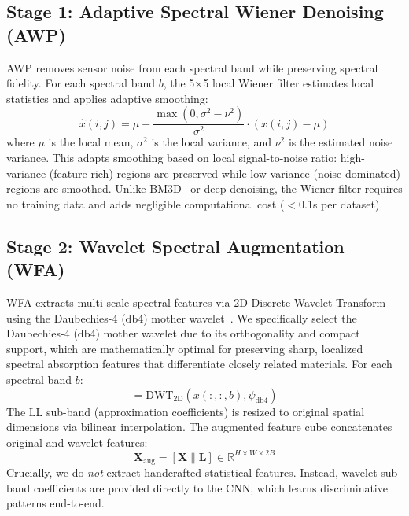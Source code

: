 \documentclass[pdflatex,sn-mathphys-num]{sn-jnl}
\theoremstyle{thmstyleone}
\theoremstyle{thmstyletwo}
\theoremstyle{thmstylethree}
\begin{document}
\subsection{Stage 1: Adaptive Spectral Wiener Denoising (AWP)}

AWP removes sensor noise from each spectral band while preserving spectral fidelity. For each spectral band $b$, the 5$\times$5 local Wiener filter estimates local statistics and applies adaptive smoothing:
\begin{equation}
\hat{x}(i,j) = \mu + \frac{\max(0, \sigma^2 - \nu^2)}{\sigma^2} \cdot (x(i,j) - \mu)
\end{equation}
where $\mu$ is the local mean, $\sigma^2$ is the local variance, and $\nu^2$ is the estimated noise variance. This adapts smoothing based on local signal-to-noise ratio: high-variance (feature-rich) regions are preserved while low-variance (noise-dominated) regions are smoothed. Unlike BM3D~\cite{dabov2007image} or deep denoising, the Wiener filter requires no training data and adds negligible computational cost ($<$0.1s per dataset).

\subsection{Stage 2: Wavelet Spectral Augmentation (WFA)}

WFA extracts multi-scale spectral features via 2D Discrete Wavelet Transform using the Daubechies-4 (db4) mother wavelet~\cite{daubechies1992ten}. We specifically select the Daubechies-4 (db4) mother wavelet due to its orthogonality and compact support, which are mathematically optimal for preserving sharp, localized spectral absorption features that differentiate closely related materials. For each spectral band $b$:
\begin{equation}
[\text{LL}_b, (\text{LH}_b, \text{HL}_b, \text{HH}_b)] = \text{DWT}_{2\text{D}}(x(:,:,b), \psi_{\text{db4}})
\end{equation}
The LL sub-band (approximation coefficients) is resized to original spatial dimensions via bilinear interpolation. The augmented feature cube concatenates original and wavelet features:
\begin{equation}
\mathbf{X}_{\text{aug}} = [\mathbf{X} \| \mathbf{L}] \in \mathbb{R}^{H \times W \times 2B}
\end{equation}
Crucially, we do \textit{not} extract handcrafted statistical features. Instead, wavelet sub-band coefficients are provided directly to the CNN, which learns discriminative patterns end-to-end.
\end{document}
